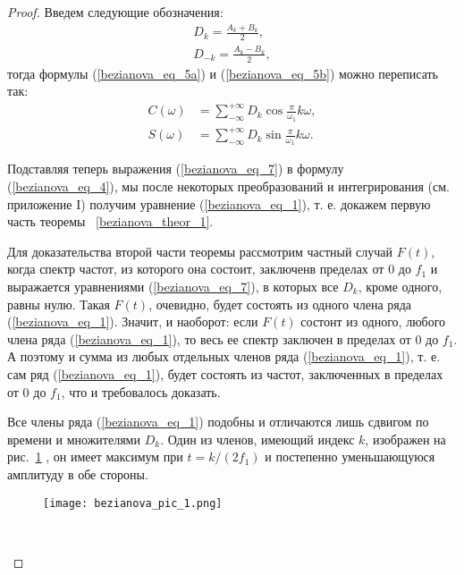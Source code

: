 \begin{proof}
Введем следующие обозначения:
\begin{equation}\label{bezianova_eq_6}
\begin{gathered}
D_k=\frac{A_k+B_k}{2}, \\
D_{-k}=\frac{A_k-B_k}{2}, 
\end{gathered}
\end{equation}
тогда формулы (\ref{bezianova_eq_5a}) и (\ref{bezianova_eq_5b}) можно переписать так:
\begin{equation}\label{bezianova_eq_7}
\begin{aligned}
C(\omega) & =\sum_{-\infty}^{+\infty} D_k \cos \frac{\pi}{\omega_1} k \omega, \\
S(\omega) & =\sum_{-\infty}^{+\infty} D_k \sin \frac{\pi}{\omega_1} k \omega.
\end{aligned}
\end{equation}

Подставляя теперь выражения (\ref{bezianova_eq_7}) в формулу (\ref{bezianova_eq_4}), мы после некоторых преобразований и интегрирования (см. приложение I) получим уравнение (\ref{bezianova_eq_1}), т. е. докажем первую часть теоремы ~\ref{bezianova_theor_1}.

Для доказательства второй части теоремы рассмотрим частный случай $F(t)$, когда спектр частот, из которого она состоит, заключенв пределах от 0 до $f_1$ и выражается уравнениями (\ref{bezianova_eq_7}), в которых все $D_k$, кроме одного, равны нулю. Такая $F(t)$, очевидно, будет состоять из одного члена ряда (\ref{bezianova_eq_1}). Значит, и наоборот: если $F(t)$ состонт из одного, любого члена ряда (\ref{bezianova_eq_1}), то весь ее спектр заключен в пределах от 0 до $f_1$. А поэтому и сумма из любых отдельных членов ряда (\ref{bezianova_eq_1}), т. е. сам ряд (\ref{bezianova_eq_1}), будет состоять из частот, заключенных в пределах от 0 до $f_1$, что и требовалось доказать.

Все члены ряда (\ref{bezianova_eq_1}) подобны и отличаются лишь сдвигом по времени и множителями $D_k$. Один из членов, имеющий индекс $k$, изображен на рис.~\ref{fig::bezianova_pic_1} , он имеет максимум при $t=k /\left(2 f_1\right)$ и постепенно уменьшающуюся амплитуду в обе стороны.

\begin{figure}[H]
        \centering
        \texttt{[image: bezianova\_pic\_1.png]}
        \caption{~}
        \label{fig::bezianova_pic_1}
    \end{figure}
    
 \end{proof}
    
